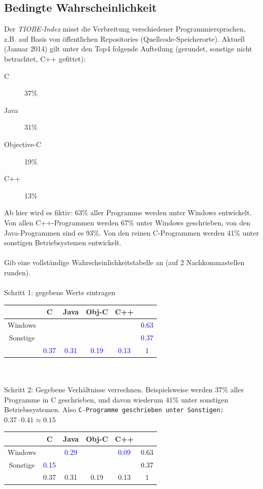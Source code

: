 \documentclass[11pt, a4paper]{article}
\begin{document}
\subsection{Bedingte Wahrscheinlichkeit}
Der \textit{TIOBE-Index} misst die Verbreitung verschiedener Programmiersprachen, z.B. auf Basis von öffentlichen Repositories (Quellcode-Speicherorte). Aktuell (Januar 2014) gilt unter den Top4 folgende Aufteilung (gerundet, sonstige nicht betrachtet, C++ gefittet):
\begin{description}
	\item[C] 37\%
	\item[Java] 31\%
	\item[Objective-C] 19\%
	\item[C++] 13\%
\end{description}
Ab hier wird es fiktiv: 63\% aller Programme werden unter Windows entwickelt. Von allen C++-Programmen werden 67\% unter Windows geschrieben, von den Java-Programmen sind es 93\%. Von den reinen C-Programmen werden 41\% unter sonstigen Betriebsystemen entwickelt. \\
\\
Gib eine vollständige Wahrscheinlichkeitstabelle an (auf 2 Nachkommastellen runden). \\
\\
Schritt 1: gegebene Werte eintragen \\
\begin{tabular}{|c|cccc|c|}
	\hline
	& C & Java & Obj-C & C++ & \\
	\hline
	Windows & & & & & \textcolor{blue}{0.63} \\
	Sonstige & & & & & \textcolor{blue}{0.37} \\
	\hline
	& \textcolor{blue}{0.37} & \textcolor{blue}{0.31} & \textcolor{blue}{0.19} & \textcolor{blue}{0.13} & 1 \\
	\hline
\end{tabular} \\
\\
Schritt 2: Gegebene Verhältnisse verrechnen. Beispielsweise werden 37\% aller Programme in C geschrieben, und davon wiederum 41\% unter sonstigen Betriebssystemen. Also \texttt{C-Programme geschrieben unter Sonstigen: $0.37 \cdot 0.41 \approx 0.15$} \\
\begin{tabular}{|c|cccc|c|}
	\hline
	& C & Java & Obj-C & C++ & \\
	\hline
	Windows & & \textcolor{blue}{0.29} & & \textcolor{blue}{0.09} & 0.63 \\
	Sonstige & \textcolor{blue}{0.15} & & & & 0.37 \\
	\hline
	& 0.37 & 0.31 & 0.19 & 0.13 & 1 \\
	\hline
\end{tabular} \\
\end{document}
